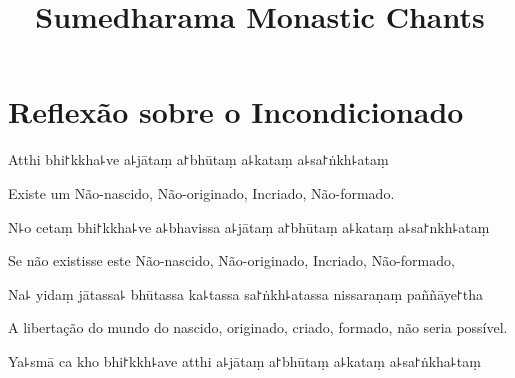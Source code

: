 \documentclass[
  babelLanguage=english,
  final,
  webversion,
]{chantingbook}
\title{Sumedharama Monastic Chants}
\begin{document}
\frontmatter



\cleartorecto
\tableofcontents*

\mainmatter

\usePsMarksTitleOnly

\chapter[Incondicionado]{Reflexão sobre o Incondicionado}


\begin{leader}
\end{leader}

Atthi bhi꜓kkha꜕ve a꜕jātaṃ a꜓bhūtaṃ a꜕kataṃ a꜕sa꜓ṅkh꜕ataṃ

\begin{english}
  Existe um Não-nascido, Não-originado, Incriado, Não-formado.
\end{english}

N꜕o cetaṃ bhi꜓kkha꜕ve a꜕bhavissa a꜕jātaṃ a꜓bhūtaṃ a꜕kataṃ a꜕sa꜓nkh꜕ataṃ

\begin{english}
 Se não existisse este Não-nascido, Não-originado, Incriado, Não-formado,
\end{english}

Na꜕ yidaṃ jātassa꜕ bhūtassa ka꜕tassa sa꜓ṅkh꜕atassa nissaraṇaṃ paññāye꜓tha

\begin{english}
  A libertação do mundo do nascido, originado, criado, formado, não seria possível.
\end{english}

Ya꜕smā ca kho bhi꜓kkh꜕ave atthi a꜕jātaṃ a꜓bhūtaṃ a꜕kataṃ a꜕sa꜓ṅkha꜕taṃ
\end{document}
